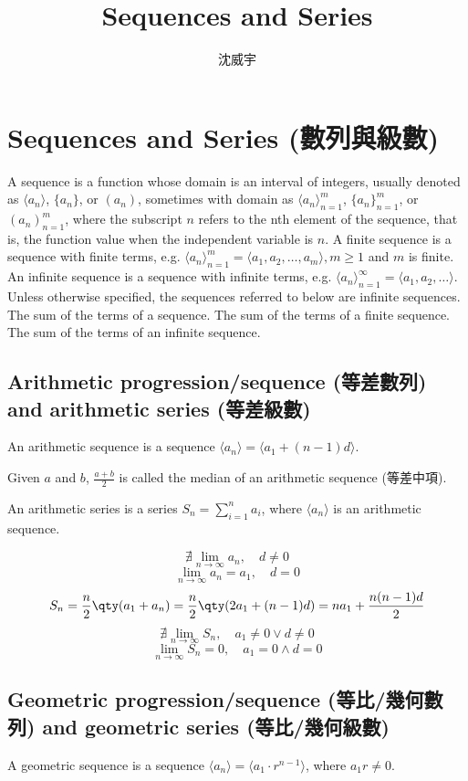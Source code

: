 \documentclass[a4paper,12pt]{article}
\begin{document}
\title{Sequences and Series}
\author{沈威宇}
\date{\temtoday}
\titletocdoc
\section{Sequences and Series (數列與級數)}
A sequence is a function whose domain is an interval of integers, usually denoted as $\langle a_n\rangle$, $\{a_n\}$, or $(a_n)$, sometimes with domain as $\langle a_n\rangle_{n=1}^m$, $\{a_n\}_{n=1}^m$, or $(a_n)_{n=1}^m$, where the subscript $n$ refers to the nth element of the sequence, that is, the function value when the independent variable is $n$.
A finite sequence is a sequence with finite terms, e.g. $\langle a_n\rangle_{n=1}^m=\langle a_1,a_2,\ldots,a_m\rangle,m\geq 1$ and $m$ is finite.
An infinite sequence is a sequence with infinite terms, e.g. $\langle a_n\rangle_{n=1}^\infty=\langle a_1,a_2,\ldots\rangle$. Unless otherwise specified, the sequences referred to below are infinite sequences.
The sum of the terms of a sequence.
The sum of the terms of a finite sequence.
The sum of the terms of an infinite sequence.
\subsection{Arithmetic progression/sequence (等差數列) and arithmetic series (等差級數)}
An arithmetic sequence is a sequence $\langle a_n\rangle=\langle a_1+(n-1)d\rangle$. 

Given $a$ and $b$, $\frac{a+b}{2}$ is called the median of an arithmetic sequence (等差中項).

An arithmetic series is a series $S_n=\sum_{i=1}^na_i$, where $\langle a_n\rangle$ is an arithmetic sequence.

\[\nexists\lim_{n\to\infty}a_n,\quad d\neq 0\]
\[\lim_{n\to\infty}a_n=a_1,\quad d=0\]
\[S_n=\frac{n}{2}\qty(a_1+a_n)=\frac{n}{2}\qty(2a_1+(n-1)d)=na_1+\frac{n(n-1)d}{2}\]
\[\nexists\lim_{n\to\infty}S_n,\quad a_1\neq 0\lor d\neq 0\]
\[\lim_{n\to\infty}S_n=0,\quad a_1=0\land d=0\]
\subsection{Geometric progression/sequence (等比/幾何數列) and geometric series (等比/幾何級數)}
A geometric sequence is a sequence $\langle a_n\rangle=\langle a_1\cdot r^{n-1}\rangle$, where $a_1r\neq 0$.
\end{document}
